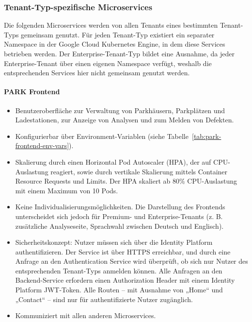 \subsubsection{Tenant-Typ-spezifische Microservices}
Die folgenden Microservices werden von allen Tenants eines bestimmten Tenant-Typs gemeinsam genutzt. Für jeden Tenant-Typ existiert ein separater Namespace in der Google Cloud Kubernetes Engine, in dem diese Services betrieben werden. Der Enterprise-Tenant-Typ bildet eine Ausnahme, da jeder Enterprise-Tenant über einen eigenen Namespace verfügt, weshalb die entsprechenden Services hier nicht gemeinsam genutzt werden.

\paragraph{PARK Frontend}
\begin{itemize}
	\item Benutzeroberfläche zur Verwaltung von Parkhäusern, Parkplätzen und Ladestationen, zur Anzeige von Analysen und zum Melden von Defekten.
	\item Konfigurierbar über Environment-Variablen (siehe Tabelle~\ref{tab:park-frontend-env-vars}).
	\item Skalierung durch einen Horizontal Pod Autoscaler (HPA), der auf CPU-Auslastung reagiert, sowie durch vertikale Skalierung mittels Container Resource Requests und Limits. Der HPA skaliert ab 80\% CPU-Auslastung mit einem Maximum von 10 Pods.
	\item Keine Individualisierungsmöglichkeiten. Die Darstellung des Frontends unterscheidet sich jedoch für Premium- und Enterprise-Tenants (z. B. zusätzliche Analyseseite, Sprachwahl zwischen Deutsch und Englisch).
	\item Sicherheitskonzept: Nutzer müssen sich über die Identity Platform authentifizieren. Der Service ist über HTTPS erreichbar, und durch eine Anfrage an den Authentication Service wird überprüft, ob sich nur Nutzer des entsprechenden Tenant-Typs anmelden können. Alle Anfragen an den Backend-Service erfordern einen Authorization Header mit einem Identity Platform JWT-Token. Alle Routen – mit Ausnahme von „Home“ und „Contact“ – sind nur für authentifizierte Nutzer zugänglich.
	\item Kommuniziert mit allen anderen Microservices.
\end{itemize}

